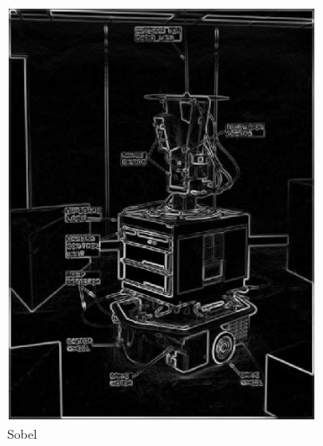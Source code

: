 \documentclass[lettersize,journal]{IEEEtran}
\begin{document}
\begin{figure}[h]
\begin{subfigure}[h]{0.155\textwidth}
        \centering 
        \includegraphics[width=\linewidth]{heavy_blur_9x9_sigma_3_magnitude}
        \caption{Sobel}  
    \end{subfigure}
    \begin{subfigure}[h]{0.155\textwidth}
        \centering

\end{subfigure}
\end{figure}
\end{document}
